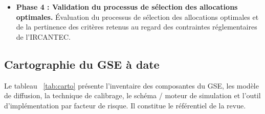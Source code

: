 \documentclass[11pt,a4paper]{article}
\begin{document}
\begin{itemize}
\begin{enumerate}[label=\textbf{\color{nexred}Axe \arabic*.},leftmargin=2.6em]
        \item \textbf{Points d'attention et alternatives.} Identification des limites et proposition de modèles et d'approches (calibrage, simulation) alternatifs, plus pertinents sur le plan économique et mathématique. Cette sous-partie permet de formuler des recommandations d'évolution au regard des travaux menés.
    \end{enumerate}
    \item \textbf{Phase 4 : Validation du processus de sélection des allocations optimales.}
    Évaluation du processus de sélection des allocations optimales et de la pertinence des critères retenus au regard des contraintes réglementaires de l’IRCANTEC.
    
\end{itemize}

\subsection{Cartographie du GSE à date}
\label{sec:carto}

Le tableau ~\ref{tab:carto} présente l'inventaire des composantes du GSE, les modèle de diffusion, la technique de calibrage, le schéma / moteur de simulation et l'outil d'implémentation par facteur de risque. Il constitue le référentiel de la revue.
\end{document}
